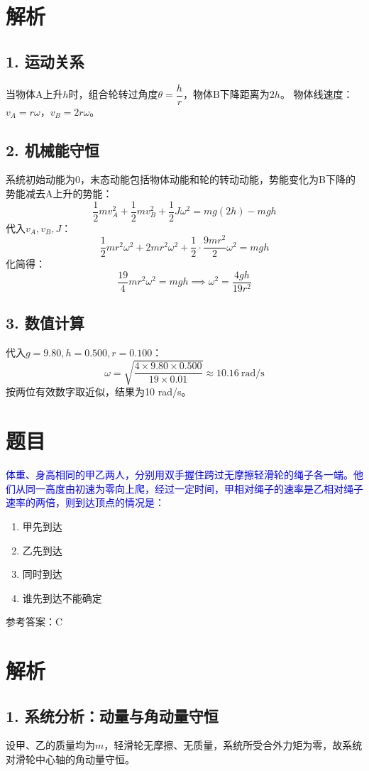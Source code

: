 \documentclass[11pt,a4paper]{article}
\begin{document}
\section*{解析}

\subsection*{1. 运动关系}
当物体A上升$h$时，组合轮转过角度$\theta = \dfrac{h}{r}$，物体B下降距离为$2h$。
物体线速度：$v_A=r\omega$，$v_B=2r\omega$。

\subsection*{2. 机械能守恒}
系统初始动能为0，末态动能包括物体动能和轮的转动动能，势能变化为B下降的势能减去A上升的势能：
\[
\frac{1}{2}mv_A^2 + \frac{1}{2}mv_B^2 + \frac{1}{2}J\omega^2 = mg(2h) - mgh
\]
代入$v_A, v_B, J$：
\[
\frac{1}{2}mr^2\omega^2 + 2mr^2\omega^2 + \frac{1}{2} \cdot \frac{9mr^2}{2}\omega^2 = mgh
\]
化简得：
\[
\frac{19}{4}mr^2\omega^2 = mgh \implies \omega^2 = \frac{4gh}{19r^2}
\]

\subsection*{3. 数值计算}
代入$g=9.80, h=0.500, r=0.100$：
\[
\omega = \sqrt{\frac{4 \times 9.80 \times 0.500}{19 \times 0.01}} \approx 10.16\ \text{rad/s}
\]
按两位有效数字取近似，结果为10 rad/s。


\section*{题目}
\textcolor{blue}{体重、身高相同的甲乙两人，分别用双手握住跨过无摩擦轻滑轮的绳子各一端。他们从同一高度由初速为零向上爬，经过一定时间，甲相对绳子的速率是乙相对绳子速率的两倍，则到达顶点的情况是：}
\begin{enumerate}
    \item[A] 甲先到达
    \item[B] 乙先到达
    \item[C] 同时到达
    \item[D] 谁先到达不能确定
\end{enumerate}
参考答案：C

\section*{解析}

\subsection*{1. 系统分析：动量与角动量守恒}
设甲、乙的质量均为$m$，轻滑轮无摩擦、无质量，系统所受合外力矩为零，故系统对滑轮中心轴的角动量守恒。
\end{document}
